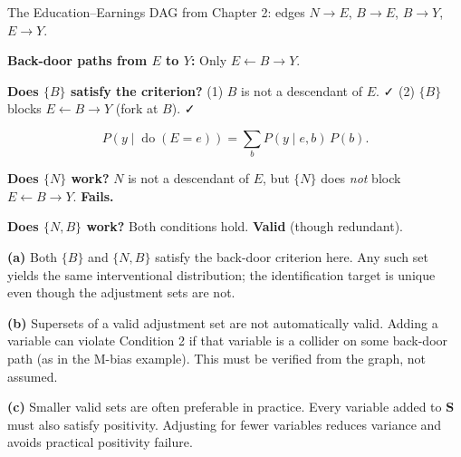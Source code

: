 \documentclass[
  a4paper,
]{book}
\newcommand{\doop}{\operatorname{do}}
\begin{document}
\begin{tcolorbox}[enhanced jigsaw, arc=.35mm, bottomrule=.15mm, bottomtitle=1mm, breakable, colback=white, colbacktitle=quarto-callout-note-color!10!white, colframe=quarto-callout-note-color-frame, coltitle=black, left=2mm, leftrule=.75mm, opacityback=0, opacitybacktitle=0.6, rightrule=.15mm, title={Example: Back-Door Identification in the Education Example}, titlerule=0mm, toprule=.15mm, toptitle=1mm]

The Education--Earnings DAG from Chapter 2: edges \(N \to E\),
\(B \to E\), \(B \to Y\), \(E \to Y\).

\textbf{Back-door paths from \(E\) to \(Y\):} Only
\(E \leftarrow B \to Y\).

\textbf{Does \(\{B\}\) satisfy the criterion?} (1) \(B\) is not a
descendant of \(E\). ✓ (2) \(\{B\}\) blocks \(E \leftarrow B \to Y\)
(fork at \(B\)). ✓

\[P(y \mid \doop(E{=}e)) = \sum_b P(y \mid e, b)\,P(b).\]

\textbf{Does \(\{N\}\) work?} \(N\) is not a descendant of \(E\), but
\(\{N\}\) does \emph{not} block \(E \leftarrow B \to Y\).
\textbf{Fails.}

\textbf{Does \(\{N, B\}\) work?} Both conditions hold. \textbf{Valid}
(though redundant).

\end{tcolorbox}

\begin{tcolorbox}[enhanced jigsaw, arc=.35mm, bottomrule=.15mm, bottomtitle=1mm, breakable, colback=white, colbacktitle=quarto-callout-note-color!10!white, colframe=quarto-callout-note-color-frame, coltitle=black, left=2mm, leftrule=.75mm, opacityback=0, opacitybacktitle=0.6, rightrule=.15mm, title={Remark: Multiple Valid Adjustment Sets}, titlerule=0mm, toprule=.15mm, toptitle=1mm]

\textbf{(a)} Both \(\{B\}\) and \(\{N,B\}\) satisfy the back-door
criterion here. Any such set yields the same interventional
distribution; the identification target is unique even though the
adjustment sets are not.

\textbf{(b)} Supersets of a valid adjustment set are not automatically
valid. Adding a variable can violate Condition 2 if that variable is a
collider on some back-door path (as in the M-bias example). This must be
verified from the graph, not assumed.

\textbf{(c)} Smaller valid sets are often preferable in practice. Every
variable added to \(\mathbf{S}\) must also satisfy positivity. Adjusting
for fewer variables reduces variance and avoids practical positivity
failure.

\end{tcolorbox}
\end{document}
